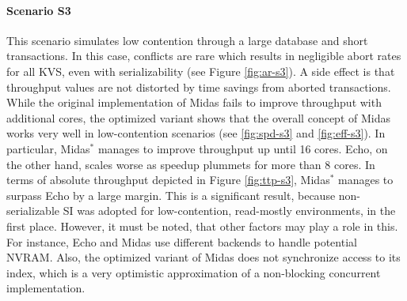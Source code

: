 
\paragraph{Scenario S3}

This scenario simulates low contention through a large database and short transactions. In this case, conflicts are rare which results in negligible abort rates for all KVS, even with serializability (see Figure \ref{fig:ar-s3}). A side effect is that throughput values are not distorted by time savings from aborted transactions. While the original implementation of Midas fails to improve throughput with additional cores, the optimized variant shows that the overall concept of Midas works very well in low-contention scenarios (see \ref{fig:spd-s3} and \ref{fig:eff-s3}). In particular, Midas$^{*}$ manages to improve throughput up until 16 cores. Echo, on the other hand, scales worse as speedup plummets for more than 8 cores. In terms of absolute throughput depicted in Figure \ref{fig:ttp-s3}, Midas$^{*}$ manages to surpass Echo by a large margin. This is a significant result, because non-serializable SI was adopted for low-contention, read-mostly environments, in the first place. However, it must be noted, that other factors may play a role in this. For instance, Echo and Midas use different backends to handle potential NVRAM. Also, the optimized variant of Midas does not synchronize access to its index, which is a very optimistic approximation of a non-blocking concurrent implementation.

